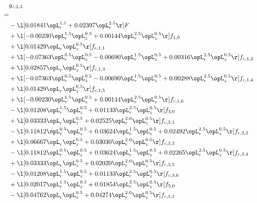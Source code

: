 \begin{alignat}{2} 
\label{eq:g_23_0} 
& g_{c,2,3} \nonumber \\ 
 = \\ 
& - \l[  0.01841 \opL_r^{1.5} +  0.02397 \opL_r^{2.5}  \r] F \nonumber \\ 
& + \l[  -0.00230 \opL_r^{1.5} \opL_z^{0.5} +  0.00144 \opL_r^{2.5} \opL_z^{0.5}  \r] f_{1,0} \nonumber \\ 
& + \l[  0.01429 \opL_r \opL_z^{0.5}  \r] f_{c,1,1} \nonumber \\ 
& + \l[  -0.07363 \opL_r^{0.5} \opL_z^{0.5}   -0.00690 \opL_r^{1.5} \opL_z^{0.5} +  0.00316 \opL_r^{2.5} \opL_z^{0.5}  \r] f_{c,1,2} \nonumber \\ 
& + \l[  0.02857 \opL_r \opL_z^{0.5}  \r] f_{c,1,3} \nonumber \\ 
& + \l[  -0.07363 \opL_r^{0.5} \opL_z^{0.5}   -0.00690 \opL_r^{1.5} \opL_z^{0.5} +  0.00288 \opL_r^{2.5} \opL_z^{0.5}  \r] f_{c,1,4} \nonumber \\ 
& + \l[  0.01429 \opL_r \opL_z^{0.5}  \r] f_{c,1,5} \nonumber \\ 
& + \l[  -0.00230 \opL_r^{1.5} \opL_z^{0.5} +  0.00144 \opL_r^{2.5} \opL_z^{0.5}  \r] f_{c,1,6} \nonumber \\ 
& - \l[  0.01208 \opL_r^{1.5} \opL_z^{0.5} +  0.01133 \opL_r^{2.5} \opL_z^{0.5}  \r] f_{3,0} \nonumber \\ 
& + \l[  0.03333 \opL_r \opL_z^{0.5} +  0.02525 \opL_r^{2.0} \opL_z^{0.5}  \r] f_{c,3,1} \nonumber \\ 
& - \l[  0.11812 \opL_r^{0.5} \opL_z^{0.5} +  0.03624 \opL_r^{1.5} \opL_z^{0.5} +  0.02492 \opL_r^{2.5} \opL_z^{0.5}  \r] f_{c,3,2} \nonumber \\ 
& + \l[  0.06667 \opL_r \opL_z^{0.5} +  0.03030 \opL_r^{2.0} \opL_z^{0.5}  \r] f_{c,3,3} \nonumber \\ 
& - \l[  0.11812 \opL_r^{0.5} \opL_z^{0.5} +  0.03624 \opL_r^{1.5} \opL_z^{0.5} +  0.02265 \opL_r^{2.5} \opL_z^{0.5}  \r] f_{c,3,4} \nonumber \\ 
& + \l[  0.03333 \opL_r \opL_z^{0.5} +  0.02020 \opL_r^{2.0} \opL_z^{0.5}  \r] f_{c,3,5} \nonumber \\ 
& - \l[  0.01208 \opL_r^{1.5} \opL_z^{0.5} +  0.01133 \opL_r^{2.5} \opL_z^{0.5}  \r] f_{c,3,6} \nonumber \\ 
& + \l[  0.02017 \opL_r^{1.5} \opL_z^{0.5} +  0.01854 \opL_r^{2.5} \opL_z^{0.5}  \r] f_{5,0} \nonumber \\ 
& - \l[  0.04762 \opL_r \opL_z^{0.5} +  0.04274 \opL_r^{2.0} \opL_z^{0.5}  \r] f_{c,5,1} \nonumber \\ 

\end{alignat}
